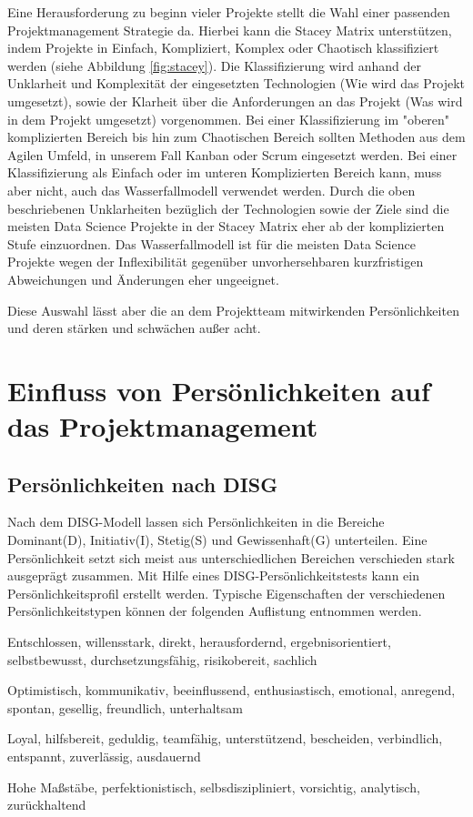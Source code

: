 \documentclass[twocolumn,10pt]{asme2ej}
\begin{document}
Eine Herausforderung zu beginn vieler Projekte stellt die Wahl einer passenden Projektmanagement Strategie da. Hierbei kann die Stacey Matrix \cite{Stacey2011StrategicMA} unterstützen, indem Projekte in Einfach, Kompliziert, Komplex oder Chaotisch klassifiziert werden (siehe Abbildung \ref{fig:stacey}). Die Klassifizierung wird anhand der Unklarheit und Komplexität der eingesetzten Technologien (Wie wird das Projekt umgesetzt), sowie der Klarheit über die Anforderungen an das Projekt (Was wird in dem Projekt umgesetzt) vorgenommen. Bei einer Klassifizierung im "oberen" komplizierten Bereich bis hin zum Chaotischen Bereich sollten Methoden aus dem Agilen Umfeld, in unserem Fall Kanban oder Scrum eingesetzt werden. Bei einer Klassifizierung als Einfach oder im unteren Komplizierten Bereich kann, muss aber nicht, auch das Wasserfallmodell verwendet werden. Durch die oben beschriebenen Unklarheiten bezüglich der Technologien sowie der Ziele sind die meisten Data Science Projekte in der Stacey Matrix eher ab der komplizierten Stufe einzuordnen. Das Wasserfallmodell ist für die meisten Data Science Projekte wegen der Inflexibilität gegenüber unvorhersehbaren kurzfristigen Abweichungen und Änderungen  eher ungeeignet.

Diese Auswahl lässt aber die an dem Projektteam mitwirkenden Persönlichkeiten und deren stärken und schwächen außer acht.

\section{Einfluss von Persönlichkeiten auf das Projektmanagement}\label{sec:2}

\subsection{Persönlichkeiten nach DISG}
Nach dem DISG-Modell \cite{disc} lassen sich Persönlichkeiten in die Bereiche Dominant(D), Initiativ(I), Stetig(S) und Gewissenhaft(G) unterteilen. Eine Persönlichkeit setzt sich meist aus unterschiedlichen Bereichen verschieden stark ausgeprägt zusammen. Mit Hilfe eines DISG-Persönlichkeitstests kann ein Persönlichkeitsprofil erstellt werden. Typische Eigenschaften der verschiedenen Persönlichkeitstypen können der folgenden Auflistung entnommen werden.

\begin{description}[align=left]
	\item [Dominant] Entschlossen, willensstark, direkt, herausfordernd, ergebnisorientiert, selbstbewusst, durchsetzungsfähig, risikobereit, sachlich
	\item [Initiativ] Optimistisch, kommunikativ, beeinflussend, enthusiastisch, emotional, anregend, spontan, gesellig, freundlich, unterhaltsam
	\item [Stetig] Loyal, hilfsbereit, geduldig, teamfähig, unterstützend, bescheiden, verbindlich, entspannt, zuverlässig, ausdauernd
	\item [Gewissenhaft] Hohe Maßstäbe, perfektionistisch, selbsdiszipliniert, vorsichtig, analytisch, zurückhaltend
	 \cite{disg_charakteristika}
\end{description}
\end{document}
